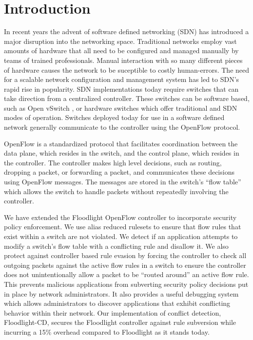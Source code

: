 \section{Introduction}
\label{sec:intro}

In recent years the advent of software defined networking (SDN) has introduced a major disruption into the networking space.
Traditional networks employ vast amounts of hardware that all need to be configured and managed manually by teams of trained professionals.
Manual interaction with so many different pieces of hardware causes the network to be suceptible to costly human-errors. 
The need for a scalable network configuration and management system has led to SDN's rapid rise in popularity.
SDN implementations today require switches that can take direction from a centralized controller.
These switches can be software based, such as Open vSwitch \cite{DBLP:conf/hotnets/PfaffPACKS09}, or hardware switches which offer traditional and SDN modes of operation.
Switches deployed today for use in a software defined network generally communicate to the controller using the OpenFlow protocol.

OpenFlow \cite{McKeown:2008:OEI:1355734.1355746} is a standardized protocol that facilitates coordination between the data plane, which resides in the switch, and the control plane, which resides in the controller.
The controller makes high level decisions, such as routing, dropping a packet, or forwarding a packet, and communicates these decisions using OpenFlow messages.
The messages are stored in the switch's ``flow table'' which allows the switch to handle packets without repeatedly involving the controller. 


We have extended the Floodlight OpenFlow controller \cite{floodlight} to incorporate security policy enforcement.
We use alias reduced rulesets to ensure that flow rules that exist within a switch are not violated.
We detect if an application attempts to modify a switch's flow table with a conflicting rule and disallow it.
We also protect against controller based rule evasion by forcing the controller to check all outgoing packets against the active flow rules in a switch to ensure the controller does not unintentionally allow a packet to be ``routed around'' an active flow rule.
This prevents malicious applications from subverting security policy decisions put in place by network administrators.
It also provides a useful debugging system which allows administrators to discover applications that exhibit conflicting behavior within their network.
Our implementation of conflict detection, Floodlight-CD, secures the Floodlight controller against rule subversion while incurring a 15\% overhead compared to Floodlight as it stands today. 

